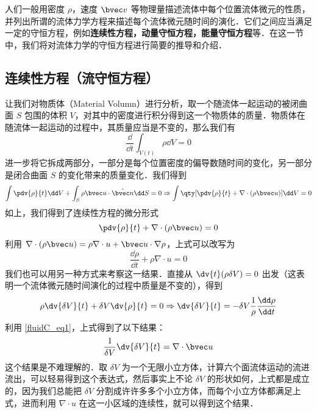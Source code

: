 

人们一般用密度 $\rho$，速度 $\bvec v$ 等物理量描述流体中每个位置流体微元的性质，并列出所谓的流体力学方程来描述每个流体微元随时间的演化．它们之间应当满足一定的守恒方程，例如\textbf{连续性方程，动量守恒方程，能量守恒方程}等．在这一节中，我们将对流体力学的守恒方程进行简要的推导和介绍．
\subsection{连续性方程（流守恒方程）}
让我们对物质体（Material Volumn）进行分析，取一个随流体一起运动的被闭曲面 $S$ 包围的体积 $V$，对其中的密度进行积分得到这一个物质体的质量．物质体在随流体一起运动的过程中，其质量应当是不变的，那么我们有
\begin{equation}
\frac{\dd}{\dd t}\int_{V(t)} \rho \dd V=0
\end{equation}
进一步将它拆成两部分，一部分是每个位置密度的偏导数随时间的变化，另一部分是闭合曲面 $S$ 的变化带来的质量变化．我们得到
\begin{equation}
\int \pdv{\rho}{t}\dd V+\int_S \rho \bvec u\cdot \hat{\bvec n}\dd S=0\Rightarrow \int \qty[\pdv{\rho}{t}+\nabla\cdot(\rho\bvec u)]\dd V=0
\end{equation}
如上，我们得到了连续性方程的微分形式
\begin{equation}
\pdv{\rho}{t}+\nabla\cdot(\rho\bvec u)=0
\end{equation}
利用 $\nabla\cdot (\rho\bvec u)=\rho \nabla\cdot u+\bvec u\cdot \nabla \rho$，上式可以改写为
\begin{equation}\label{fluidC_eq1}
\frac{\dd \rho}{\dd t}+\rho \nabla\cdot u=0
\end{equation}
我们也可以用另一种方式来考察这一结果．直接从 $\dv{t} (\rho \delta V)=0$ 出发（这表明一个流体微元随时间演化的过程中质量是不变的），得到
\begin{equation}
\rho \dv{\delta V}{t}+\delta V\dv{\rho}{t}=0\Rightarrow \dv{\delta V}{t}=-\delta V \frac{1}{\rho}\frac{\dd \rho}{\dd t}
\end{equation}
利用 \autoref{fluidC_eq1}，上式得到了以下结果：
\begin{equation}
\frac{1}{\delta V}\dv{\delta V}{t}=\nabla\cdot \bvec u
\end{equation}
这个结果是不难理解的．取 $\delta V$ 为一个无限小立方体，计算六个面流体运动的流进流出，可以轻易得到这个表达式，然后事实上不论 $\delta V$ 的形状如何，上式都是成立的，因为我们总能把 $\delta V$ 分割成许许多多个小立方体，而每个小立方体都满足上式，进而利用 $\nabla\cdot u$ 在这一小区域的连续性，就可以得到这个结果．
